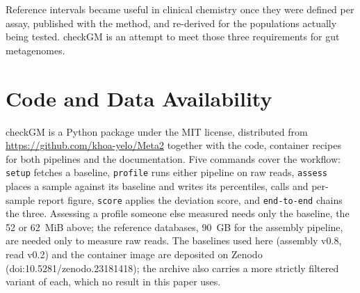 \documentclass[conference]{IEEEtran}
\begin{document}
Reference intervals became useful in clinical chemistry once they were defined per assay, published with the method, and re-derived for the populations actually being tested. checkGM is an attempt to meet those three requirements for gut metagenomes.

\section{Code and Data Availability}

checkGM is a Python package under the MIT license, distributed from \url{https://github.com/khoa-yelo/Meta2} together with the code, container recipes for both pipelines and the documentation. Five commands cover the workflow: \texttt{setup} fetches a baseline, \texttt{profile} runs either pipeline on raw reads, \texttt{assess} places a sample against its baseline and writes its percentiles, calls and per-sample report figure, \texttt{score} applies the deviation score, and \texttt{end-to-end} chains the three. Assessing a profile someone else measured needs only the baseline, the 52 or 62~MiB above; the reference databases, 90~GB for the assembly pipeline, are needed only to measure raw reads. The baselines used here (assembly v0.8, read v0.2) and the container image are deposited on Zenodo (doi:10.5281/zenodo.23181418); the archive also carries a more strictly filtered variant of each, which no result in this paper uses.
\end{document}
